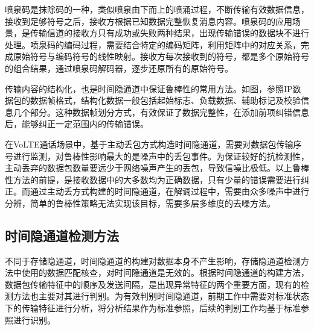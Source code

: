 喷泉码是抹除码的一种，类似喷泉由下而上的喷涌过程，不断传输有效数据信息，接收到足够符号之后，接收方根据已知数据完整恢复消息内容。喷泉码的应用场景，是传输信道的接收方只有成功或失败两种结果，出现传输错误的数据块不进行处理。喷泉码的编码过程，需要结合特定的编码矩阵，利用矩阵中的对应关系，完成原始符号与编码符号的线性映射。接收方每次接收到的符号，都是多个原始符号的组合结果，通过喷泉码解码器，逐步还原所有的原始符号。


传输内容的结构化，也是时间隐通道中保证鲁棒性的常用方法。如图，参照IP数据包的数据帧格式，结构化数据一般包括起始标志、负载数据、辅助标记及校验信息几个部分。这种数据帧划分方式，有效保证了数据完整性，在添加前项纠错信息后，能够纠正一定范围内的传输错误。

在VoLTE通话场景中，基于主动丢包方式构造时间隐通道，需要对数据包传输序号进行监测，对鲁棒性影响最大的是噪声中的丢包事件。为保证较好的抗检测性，主动丢弃的数据包数量要远少于网络噪声产生的丢包，导致信噪比极低。以上鲁棒性方法的前提，是接收数据中的大多数均为正确数据，只有少量的错误需要进行纠正。而通过主动丢方式构建的时间隐通道，在解调过程中，需要由众多噪声中进行分辨，简单的鲁棒性策略无法实现该目标，需要多层多维度的去噪方法。

\subsection{时间隐通道检测方法}
\label{sec:intro:background:detect}

不同于存储隐通道，时间隐通道的构建对数据本身不产生影响，存储隐通道检测方法中使用的数据匹配核查，对时间隐通道是无效的。根据时间隐通道的构建方法，数据包传输特征中的顺序及发送间隔，是出现异常特征的两个重要方面，现有的检测方法也主要对其进行判别。为有效判别时间隐通道，前期工作中需要对标准状态下的传输特征进行分析，将分析结果作为标准参照，后续的判别工作均基于标准参照进行识别。


